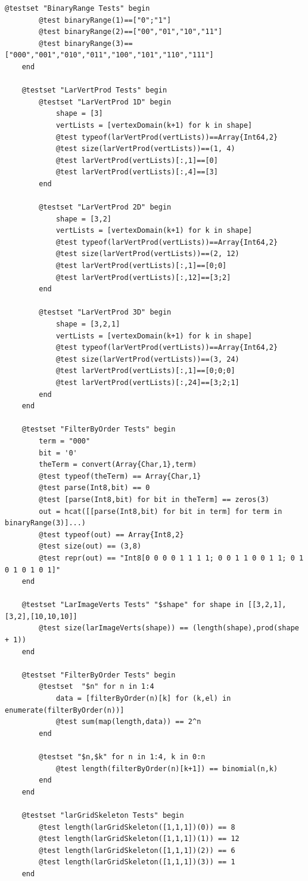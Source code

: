 \documentclass{article}
\begin{document}
\begin{flushleft}
\begin{list}{}{}
\begin{Verbatim}[tabsize=4]
	@testset "BinaryRange Tests" begin
		@test binaryRange(1)==["0";"1"]
		@test binaryRange(2)==["00","01","10","11"]
		@test binaryRange(3)==["000","001","010","011","100","101","110","111"]
	end

	@testset "LarVertProd Tests" begin
		@testset "LarVertProd 1D" begin
			shape = [3]
			vertLists = [vertexDomain(k+1) for k in shape]
			@test typeof(larVertProd(vertLists))==Array{Int64,2}
			@test size(larVertProd(vertLists))==(1, 4)
			@test larVertProd(vertLists)[:,1]==[0]
			@test larVertProd(vertLists)[:,4]==[3]
		end

		@testset "LarVertProd 2D" begin
			shape = [3,2]
			vertLists = [vertexDomain(k+1) for k in shape]
			@test typeof(larVertProd(vertLists))==Array{Int64,2}
			@test size(larVertProd(vertLists))==(2, 12)
			@test larVertProd(vertLists)[:,1]==[0;0]
			@test larVertProd(vertLists)[:,12]==[3;2]
		end

		@testset "LarVertProd 3D" begin
			shape = [3,2,1]
			vertLists = [vertexDomain(k+1) for k in shape]
			@test typeof(larVertProd(vertLists))==Array{Int64,2}
			@test size(larVertProd(vertLists))==(3, 24)
			@test larVertProd(vertLists)[:,1]==[0;0;0]
			@test larVertProd(vertLists)[:,24]==[3;2;1]
		end
	end

	@testset "FilterByOrder Tests" begin
		term = "000"
		bit = '0'
		theTerm = convert(Array{Char,1},term)
		@test typeof(theTerm) == Array{Char,1}
		@test parse(Int8,bit) == 0
		@test [parse(Int8,bit) for bit in theTerm] == zeros(3)
		out = hcat([[parse(Int8,bit) for bit in term] for term in binaryRange(3)]...)
		@test typeof(out) == Array{Int8,2}
		@test size(out) == (3,8)
		@test repr(out) == "Int8[0 0 0 0 1 1 1 1; 0 0 1 1 0 0 1 1; 0 1 0 1 0 1 0 1]"
	end

	@testset "LarImageVerts Tests" "$shape" for shape in [[3,2,1],[3,2],[10,10,10]]
		@test size(larImageVerts(shape)) == (length(shape),prod(shape + 1))
	end

	@testset "FilterByOrder Tests" begin
		@testset  "$n" for n in 1:4
			data = [filterByOrder(n)[k] for (k,el) in enumerate(filterByOrder(n))]
			@test sum(map(length,data)) == 2^n
		end

		@testset "$n,$k" for n in 1:4, k in 0:n
			@test length(filterByOrder(n)[k+1]) == binomial(n,k)
		end 
	end

	@testset "larGridSkeleton Tests" begin
		@test length(larGridSkeleton([1,1,1])(0)) == 8
		@test length(larGridSkeleton([1,1,1])(1)) == 12
		@test length(larGridSkeleton([1,1,1])(2)) == 6
		@test length(larGridSkeleton([1,1,1])(3)) == 1
	end


\end{Verbatim}
\end{list}
\end{flushleft}
\end{document}
